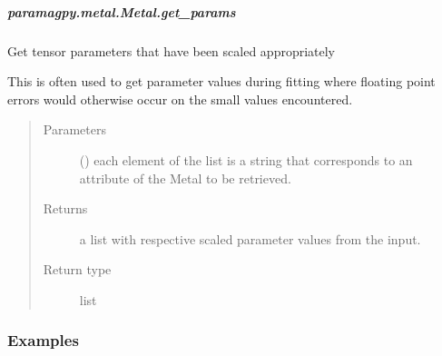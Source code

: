 \documentclass[a4paper,10pt,english]{sphinxmanual}
\begin{document}
\begin{fulllineitems}
\begin{fulllineitems}
\subparagraph{paramagpy.metal.Metal.get\_params}
\label{\detokenize{reference/generated/paramagpy.metal.Metal.get_params:paramagpy-metal-metal-get-params}}\label{\detokenize{reference/generated/paramagpy.metal.Metal.get_params::doc}}

\begin{fulllineitems}
\label{\detokenize{reference/generated/paramagpy.metal.Metal.get_params:paramagpy.metal.Metal.get_params}}
Get tensor parameters that have been scaled appropriately

This is often used to get parameter values during fitting where
floating point errors would otherwise occur on the small values
encountered.
\begin{quote}\begin{description}
\item[{Parameters}] \leavevmode
{} () \textendash{} each element of the list is a string that corresponds to
an attribute of the Metal to be retrieved.

\item[{Returns}] \leavevmode
{} \textendash{} a list with respective scaled parameter values from the input.

\item[{Return type}] \leavevmode
list

\end{description}\end{quote}
\subsubsection*{Examples}

%
\begin{sphinxVerbatim}[commandchars=\\\{\}]
  \PYG{p}{[} \PYG{p}{]}\PYG{p}{[}\PYG{p}{]}
\PYG{p}{[}\PYG{p}{]}
\end{sphinxVerbatim}


\end{fulllineitems}
\end{fulllineitems}
\end{fulllineitems}
\end{document}
